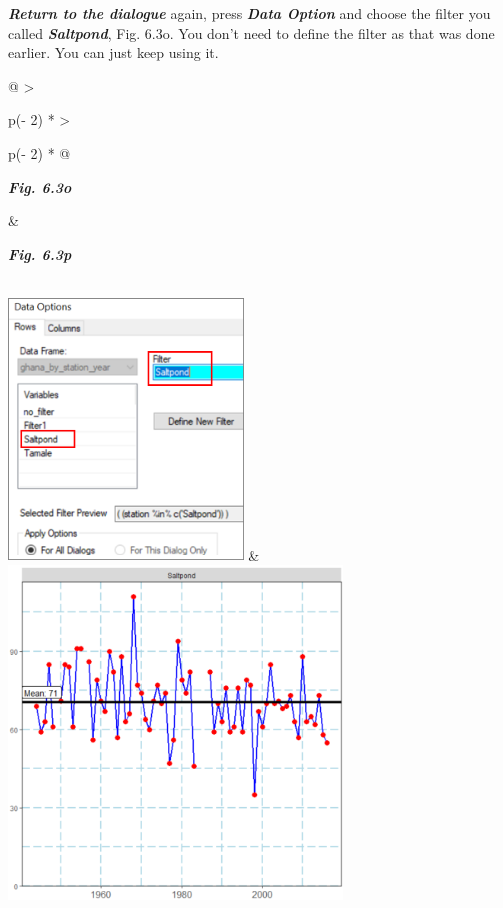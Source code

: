 \documentclass[
  letterpaper,
  DIV=11,
  numbers=noendperiod]{scrreprt}
\begin{document}
\textbf{\emph{Return to the dialogue}} again, press \textbf{\emph{Data
Option}} and choose the filter you called \textbf{\emph{Saltpond}}, Fig.
6.3o. You don't need to define the filter as that was done earlier. You
can just keep using it.

\begin{longtable}[]{@{}
  >{\raggedright\arraybackslash}p{(\columnwidth - 2\tabcolsep) * }
  >{\raggedright\arraybackslash}p{(\columnwidth - 2\tabcolsep) * }@{}}
\toprule\noalign{}
\begin{minipage}[b]{\linewidth}\raggedright
\textbf{\emph{Fig. 6.3o}}
\end{minipage} & \begin{minipage}[b]{\linewidth}\raggedright
\textbf{\emph{Fig. 6.3p}}
\end{minipage} \\
\midrule\noalign{}
\endhead
\bottomrule\noalign{}
\endlastfoot
\includegraphics[width=2.4541in,height=2.73683in]{figures/Fig6.3o.png} &
\includegraphics[width=3.48981in,height=3.48981in]{figures/Fig6.3p.png} \\
\end{longtable}
\end{document}
